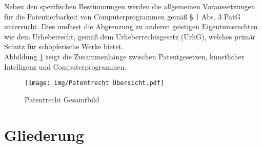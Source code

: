 Neben den spezifischen Bestimmungen werden die allgemeinen Voraussetzungen 
für die Patentierbarkeit von Computerprogrammen gemäß § 1 Abs. 3 PatG untersucht. 
Dies umfasst die Abgrenzung 
zu anderen geistigen Eigentumsrechten wie dem Urheberrecht, 
gemäß dem Urheberrechtsgesetz (UrhG), 
welches primär Schutz für schöpferische Werke bietet.
\\

Abbildung \ref{fig:patentrecht} zeigt die Zusammenhänge zwischen Patentgesetzen, 
künstlicher Intelligenz und Computerprogrammen.
\\
\begin{figure}[htb]
  \centering
  \texttt{[image: img/Patentrecht Übersicht.pdf]}\\
  \caption{Patentrecht Gesamtbild}\label{fig:patentrecht}
\end{figure}

\section{Gliederung\label{sec:outline}}


